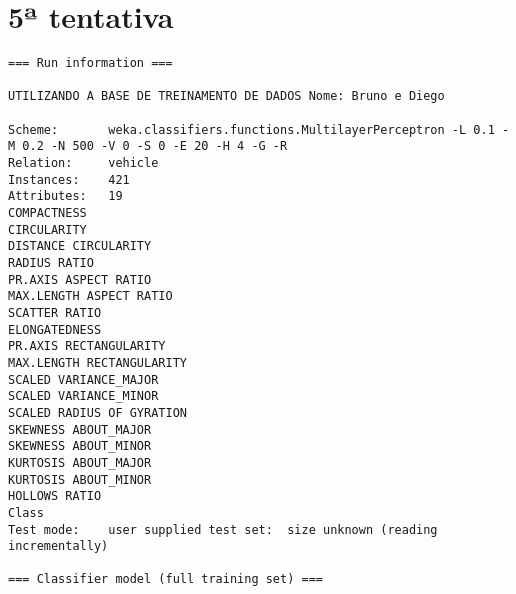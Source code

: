 \documentclass[
	article,			%
	11pt,				%
	oneside,			%
	a4paper,			%
	english,			%
	brazil,				%
	sumario=tradicional
	]{abntex2}
\begin{document}
\section{5ª tentativa}

\begin{lstlisting}
=== Run information ===

UTILIZANDO A BASE DE TREINAMENTO DE DADOS Nome: Bruno e Diego

Scheme:       weka.classifiers.functions.MultilayerPerceptron -L 0.1 -M 0.2 -N 500 -V 0 -S 0 -E 20 -H 4 -G -R
Relation:     vehicle
Instances:    421
Attributes:   19
COMPACTNESS
CIRCULARITY
DISTANCE CIRCULARITY
RADIUS RATIO
PR.AXIS ASPECT RATIO
MAX.LENGTH ASPECT RATIO
SCATTER RATIO
ELONGATEDNESS
PR.AXIS RECTANGULARITY
MAX.LENGTH RECTANGULARITY
SCALED VARIANCE_MAJOR
SCALED VARIANCE_MINOR
SCALED RADIUS OF GYRATION
SKEWNESS ABOUT_MAJOR
SKEWNESS ABOUT_MINOR
KURTOSIS ABOUT_MAJOR
KURTOSIS ABOUT_MINOR
HOLLOWS RATIO
Class
Test mode:    user supplied test set:  size unknown (reading incrementally)

=== Classifier model (full training set) ===


\end{lstlisting}
\end{document}
